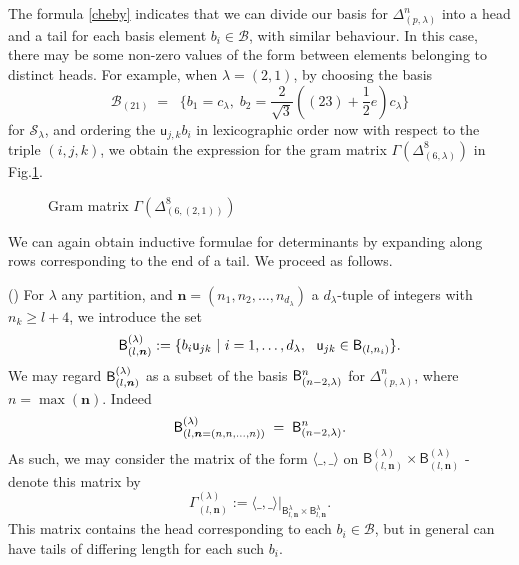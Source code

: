 \documentclass{article}
\newcommand{\ppm}[1]{\textcolor{red}{#1}}
\newcommand{\bajm}[1]{\textcolor{blue}{#1}}
\theoremstyle{definition}
\newcommand{\beq}{\begin{equation}}
\newcommand{\eq}{\end{equation}}
\newcommand{\mdef}{\refstepcounter{theorem}       \medskip \noindent ({\bf \thetheorem}) }
\newcommand{\Deltaa}{\Delta}   %
\def\uu{{\mathsf u}} %
\def\SS{\mathcal{S}} %
\def\BB{\mathcal{B}} %
\def\l{\lambda}
\numberwithin{equation}{subsection}
\begin{document}
The formula \eqref{cheby} indicates that we can divide our basis for $\Deltaa^{n}_{(p,\l)}$ into a head and a tail for each basis element $b_i \in \BB$, with similar behaviour. 
In this case, there may be some non-zero values of the form between elements belonging to distinct heads. 
For example, when $\l=(2,1)$, by choosing the basis 
\beq   \label{eq:21ortho}
{\mathcal B}_{(21)} \; 
   = \;\;\{b_1=c_{\l}, \; b_2=\frac{2}{\sqrt{3}}((23)+\frac{1}{2} e )c_{\l}\}
\eq  
for $\SS_\l$, and ordering the 
$ \uu_{j,k} b_i$ 
in lexicographic order now with respect to the triple $(i,j,k)$, we obtain the %
expression for the gram matrix $\Gamma(\Deltaa^{8}_{(6,\l)})$ 
in Fig.\ref{fig:n9la21}.

\begin{figure} \vspace{-.43in} 



    \caption{Gram matrix  $\Gamma(\Deltaa^{8}_{(6,(2,1))}) $ 
    \label{fig:n9la21}}
\vspace{-.0251in} 
\end{figure}

\medskip  

\newcommand{\B}[2]{{\mathsf B}^{#1}_{#2}}

We can again obtain inductive formulae for determinants by expanding along rows corresponding to the end of a tail. We proceed as follows.

\mdef \label{par:bmn}
For $\l$ any partition, and $\bm{n}=(n_1,n_2,\dots,n_{d_{\l}})$ a $d_\l$-tuple of integers with $n_k \geq l+4$, we introduce the set 
\[
\BBB^{(\l)}_{(l,\bm{n})}:=
   \{ b_i \uu_{jk} \ | \ i= 1,\dots, d_{\l}, \ \ \uu_{jk}\in \BBB_{(l,n_i)}\}.
\]
We may regard $\BBB^{(\l)}_{(l,\bm{n})}$ as a subset of the basis $\BBB^{n}_{(n-2,\l)}$
for $\Delta^{n}_{(p,\l)}$, where $n=\max(\bm{n})$. Indeed 
\[
\BBB^{(\l)}_{(l,\bm{n}=(n,n,...,n))}   \;  = \;    \BBB^{n}_{(n-2,\l)}  
.\]
As such, we may consider the matrix of the form $\langle\_,\_\rangle$ on $ \B{(\lambda)}{(l,\bm{n})} \times \B{(\lambda)}{(l,\bm{n})}$
- denote this matrix by 
\[
\Gamma_{(l,\bm{n})}^{(\l)}   :=  
  \langle\_,\_\rangle|_{  \B{\lambda}{l,\bm{n}} \times \B{\lambda}{l,\bm{n}} }  . 
\] 
This matrix contains the head corresponding to each $b_i\in \mathcal{B}$, but in general can have tails of differing length for each such $b_i$. 
\end{document}
